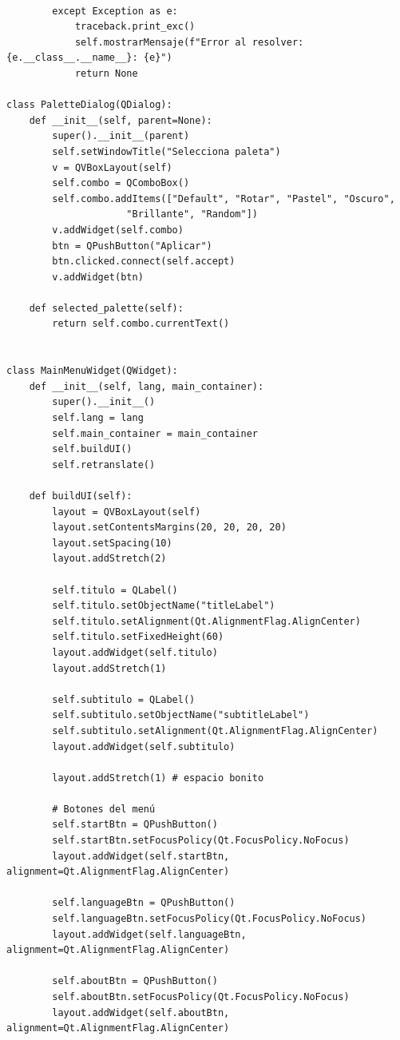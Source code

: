 \begin{lstlisting}
                 
        except Exception as e:
            traceback.print_exc()
            self.mostrarMensaje(f"Error al resolver: {e.__class__.__name__}: {e}")
            return None
        
class PaletteDialog(QDialog):
    def __init__(self, parent=None):
        super().__init__(parent)
        self.setWindowTitle("Selecciona paleta")
        v = QVBoxLayout(self)
        self.combo = QComboBox()
        self.combo.addItems(["Default", "Rotar", "Pastel", "Oscuro",
                     "Brillante", "Random"])
        v.addWidget(self.combo)
        btn = QPushButton("Aplicar")
        btn.clicked.connect(self.accept)
        v.addWidget(btn)

    def selected_palette(self):
        return self.combo.currentText()
                      
                
class MainMenuWidget(QWidget):
    def __init__(self, lang, main_container):
        super().__init__()
        self.lang = lang
        self.main_container = main_container
        self.buildUI()
        self.retranslate()
        
    def buildUI(self):
        layout = QVBoxLayout(self)
        layout.setContentsMargins(20, 20, 20, 20)
        layout.setSpacing(10)
        layout.addStretch(2)

        self.titulo = QLabel()
        self.titulo.setObjectName("titleLabel")
        self.titulo.setAlignment(Qt.AlignmentFlag.AlignCenter)
        self.titulo.setFixedHeight(60)
        layout.addWidget(self.titulo)
        layout.addStretch(1) 
        
        self.subtitulo = QLabel()
        self.subtitulo.setObjectName("subtitleLabel")
        self.subtitulo.setAlignment(Qt.AlignmentFlag.AlignCenter)
        layout.addWidget(self.subtitulo)
        
        layout.addStretch(1) # espacio bonito
        
        # Botones del menú
        self.startBtn = QPushButton()
        self.startBtn.setFocusPolicy(Qt.FocusPolicy.NoFocus)
        layout.addWidget(self.startBtn, alignment=Qt.AlignmentFlag.AlignCenter)

        self.languageBtn = QPushButton()
        self.languageBtn.setFocusPolicy(Qt.FocusPolicy.NoFocus)
        layout.addWidget(self.languageBtn, alignment=Qt.AlignmentFlag.AlignCenter)

        self.aboutBtn = QPushButton()
        self.aboutBtn.setFocusPolicy(Qt.FocusPolicy.NoFocus)
        layout.addWidget(self.aboutBtn, alignment=Qt.AlignmentFlag.AlignCenter)
        

\end{lstlisting}
